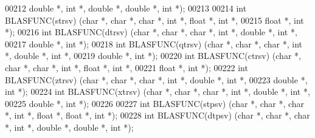\begin{DoxyCode}
00212             \textcolor{keywordtype}{double} *, \textcolor{keywordtype}{int} *, \textcolor{keywordtype}{double} *, \textcolor{keywordtype}{double} *, \textcolor{keywordtype}{int} *);
00213 
00214 \textcolor{keywordtype}{int} BLASFUNC(strsv) (\textcolor{keywordtype}{char} *, \textcolor{keywordtype}{char} *, \textcolor{keywordtype}{char} *, \textcolor{keywordtype}{int} *, \textcolor{keywordtype}{float}  *, \textcolor{keywordtype}{int} *,
00215              \textcolor{keywordtype}{float}  *, \textcolor{keywordtype}{int} *);
00216 \textcolor{keywordtype}{int} BLASFUNC(dtrsv) (\textcolor{keywordtype}{char} *, \textcolor{keywordtype}{char} *, \textcolor{keywordtype}{char} *, \textcolor{keywordtype}{int} *, \textcolor{keywordtype}{double} *, \textcolor{keywordtype}{int} *,
00217              \textcolor{keywordtype}{double} *, \textcolor{keywordtype}{int} *);
00218 \textcolor{keywordtype}{int} BLASFUNC(qtrsv) (\textcolor{keywordtype}{char} *, \textcolor{keywordtype}{char} *, \textcolor{keywordtype}{char} *, \textcolor{keywordtype}{int} *, \textcolor{keywordtype}{double} *, \textcolor{keywordtype}{int} *,
00219              \textcolor{keywordtype}{double} *, \textcolor{keywordtype}{int} *);
00220 \textcolor{keywordtype}{int} BLASFUNC(ctrsv) (\textcolor{keywordtype}{char} *, \textcolor{keywordtype}{char} *, \textcolor{keywordtype}{char} *, \textcolor{keywordtype}{int} *, \textcolor{keywordtype}{float}  *, \textcolor{keywordtype}{int} *,
00221              \textcolor{keywordtype}{float}  *, \textcolor{keywordtype}{int} *);
00222 \textcolor{keywordtype}{int} BLASFUNC(ztrsv) (\textcolor{keywordtype}{char} *, \textcolor{keywordtype}{char} *, \textcolor{keywordtype}{char} *, \textcolor{keywordtype}{int} *, \textcolor{keywordtype}{double} *, \textcolor{keywordtype}{int} *,
00223              \textcolor{keywordtype}{double} *, \textcolor{keywordtype}{int} *);
00224 \textcolor{keywordtype}{int} BLASFUNC(xtrsv) (\textcolor{keywordtype}{char} *, \textcolor{keywordtype}{char} *, \textcolor{keywordtype}{char} *, \textcolor{keywordtype}{int} *, \textcolor{keywordtype}{double} *, \textcolor{keywordtype}{int} *,
00225              \textcolor{keywordtype}{double} *, \textcolor{keywordtype}{int} *);
00226 
00227 \textcolor{keywordtype}{int} BLASFUNC(stpsv) (\textcolor{keywordtype}{char} *, \textcolor{keywordtype}{char} *, \textcolor{keywordtype}{char} *, \textcolor{keywordtype}{int} *, \textcolor{keywordtype}{float}  *, \textcolor{keywordtype}{float}  *, \textcolor{keywordtype}{int} *);
00228 \textcolor{keywordtype}{int} BLASFUNC(dtpsv) (\textcolor{keywordtype}{char} *, \textcolor{keywordtype}{char} *, \textcolor{keywordtype}{char} *, \textcolor{keywordtype}{int} *, \textcolor{keywordtype}{double} *, \textcolor{keywordtype}{double} *, \textcolor{keywordtype}{int} *);

\end{DoxyCode}
